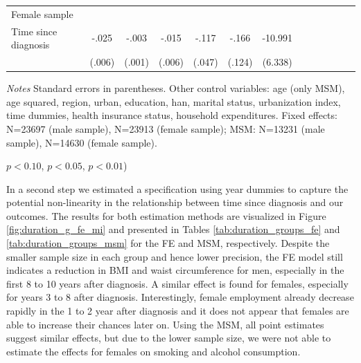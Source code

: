 \begin{table}[h]
\begin{adjustbox}{max width=\linewidth}
\begin{threeparttable}
{\begin{tabular}{l*{6}{S S}}
Female sample &&&&&&\\
Time since diagnosis  & -.025\sym{***}&    -.003\sym{*}  &    -.015\sym{***}&    -.117\sym{**} &    -.166         &  -10.991\sym{*}  \\
                &   (.006)         &   (.001)         &   (.006)         &   (.047)         &   (.124)         &  (6.338)         \\                 
\bottomrule
\end{tabular}
\begin{tablenotes}
\item \textit{Notes} Standard errors in parentheses. Other control variables: age (only MSM), age squared, region, urban, education, han, marital status, urbanization index, time dummies, health insurance status, household expenditures. Fixed effects: N=23697 (male sample), N=23913 (female sample); MSM:  N=13231 (male sample), N=14630 (female sample).
\item \sym{*} \(p<0.10\), \sym{**} \(p<0.05\), \sym{***} \(p<0.01\))
\end{tablenotes}
}
\end{threeparttable}
\end{adjustbox}
\end{table}

\FloatBarrier

In a second step we estimated a specification using year dummies to capture the potential non-linearity in the relationship between time since diagnosis and our outcomes. The results for both estimation methods are visualized in Figure \ref{fig:duration_g_fe_mi} and presented in Tables \ref{tab:duration_groups_fe} and \ref{tab:duration_groups_msm} for the \ac{FE} and \ac{MSM}, respectively. Despite the smaller sample size in each group and hence lower precision, the \ac{FE} model still indicates a reduction in \ac{BMI} and waist circumference for men, especially in the first 8 to 10 years after diagnosis. A similar effect is found for females, especially for years 3 to 8 after diagnosis. Interestingly, female employment already decrease rapidly in the 1 to 2 year after diagnosis and it does not appear that females are able to increase their chances later on. Using the \ac{MSM}, all point estimates suggest similar effects, but due to the lower sample size, we were not able to estimate the effects for females on smoking and alcohol consumption.


